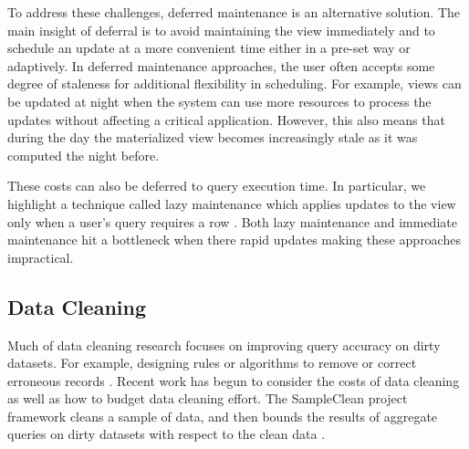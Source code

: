To address these challenges, deferred maintenance is an alternative solution.
The main insight of deferral is to avoid maintaining the view immediately and to schedule an update at a more convenient time either in a pre-set way or adaptively.
In deferred maintenance approaches, the user often accepts some degree of staleness for additional flexibility in scheduling.
For example, views can be updated at night when the system can use more resources to process the updates without affecting a critical application.
However, this also means that during the day the materialized view becomes increasingly stale as it was computed the night before.

These costs can also be deferred to query execution time.
In particular, we highlight a technique called lazy maintenance which applies updates to the view only when a user's query requires a row \cite{zhou2007lazy}.
Both lazy maintenance and immediate maintenance hit a bottleneck when there rapid updates making these approaches impractical.







\subsection{Data Cleaning}
Much of data cleaning research focuses on improving query accuracy on dirty datasets.
For example, designing rules or algorithms to remove or correct erroneous records \cite{rahm2000data}.
Recent work has begun to consider the costs of data cleaning as well as how to budget data cleaning effort.
The SampleClean project framework cleans a sample of data, and then bounds the results of aggregate queries on dirty datasets with respect to the clean data \cite{wang1999sample}.

